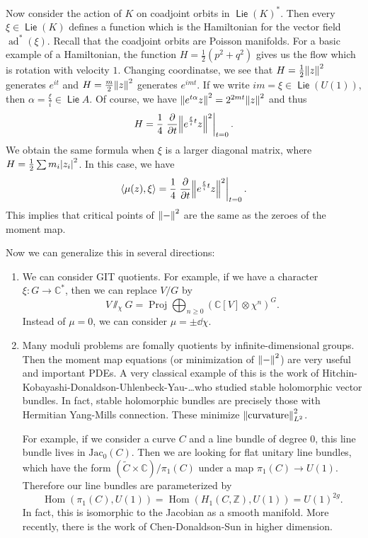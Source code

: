 \documentclass[leqno, openany]{memoir}
\theoremstyle{definition}
\theoremstyle{remark}
\theoremstyle{plain}
\theoremstyle{definition}
\theoremstyle{remark}
\newcommand{\C}{\mathbb{C}}
\newcommand{\Z}{\mathbb{Z}}
\newcommand{\mr}[1]{\mathrm{#1}}
\newcommand{\wtl}[1]{\widetilde{#1}}
\DeclareMathOperator{\Hom}{Hom}
\DeclareMathOperator{\ad}{ad}
\DeclareMathOperator{\Proj}{Proj}
\DeclareMathOperator{\Lie}{\mathsf{Lie}}
\begin{document}
Now consider the action of $K$ on coadjoint orbits in ${\Lie(K)}^*$. Then every $\xi \in \Lie(K)$ defines a function which is the Hamiltonian for the vector field $\ad^*(\xi)$. Recall that the coadjoint orbits are Poisson manifolds. For a basic example of a Hamiltonian, the function $H = \frac{1}{2}(p^2 + q^2)$ gives us the flow which is rotation with velocity $1$. Changing coordinatse, we see that $H = \frac{1}{2} \norm{z}^2$ generates $e^{it}$ and $H = \frac{m}{2} \norm{z}^2$ generates $e^{im t}$. If we write $im = \xi \in \Lie(U(1))$, then $\alpha = \frac{\xi}{i} \in \Lie A$. Of course, we have $\norm{e^{t \alpha}z}^2 = 2^{2mt} \norm{z}^2$ and thus
\[ H = \frac{1}{4} \eval{\pdv{t} \norm{e^{\frac{\xi}{i}t} z}^2}_{t = 0}. \]
We obtain the same formula when $\xi$ is a larger diagonal matrix, where $H = \frac{1}{2} \sum m_i \abs{z_i}^2$. In this case, we have
\[ \ev{\mu(z), \xi} = \frac{1}{4} \eval{\pdv{t} \norm{e^{\frac{\xi}{i}t}z}^2}_{t = 0}. \]
This implies that critical points of $\norm{-}^2$ are the same as the zeroes of the moment map.

Now we can generalize this in several directions:
\begin{enumerate}
    \item We can consider GIT quotients. For example, if we have a character $\xi \colon G \to \C^*$, then we can replace $V/G$ by 
        \[ V \sslash_{\chi} G = \Proj \bigoplus_{n \geq 0} {(\C[V] \otimes \chi^n)}^G. \]
        Instead of $\mu = 0$, we can consider $\mu = \pm \dd{\chi}$.
    \item Many moduli problems are fomally quotients by infinite-dimensional groups. Then the moment map equations (or minimization of $\norm{-}^2$) are very useful and important PDEs. A very classical example of this is the work of Hitchin-Kobayashi-Donaldson-Uhlenbeck-Yau-\ldots who studied stable holomorphic vector bundles. In fact, stable holomorphic bundles are precisely those with Hermitian Yang-Mills connection. These minimize $\norm{\text{curvature}}_{L^2}^2$.

        For example, if we consider a curve $C$ and a line bundle of degree $0$, this line bundle lives in $\mr{Jac}_0(C)$. Then we are looking for flat unitary line bundles, which have the form $(\wtl{C} \times \C) / \pi_1(C)$ under a map $\pi_1(C) \to U(1)$. Therefore our line bundles are parameterized by 
        \[ \Hom(\pi_1(C), U(1)) = \Hom(H_1(C, \Z), U(1)) = {U(1)}^{2g}. \]
        In fact, this is isomorphic to the Jacobian as a smooth manifold. More recently, there is the work of Chen-Donaldson-Sun in higher dimension. 
\end{enumerate}
\end{document}
